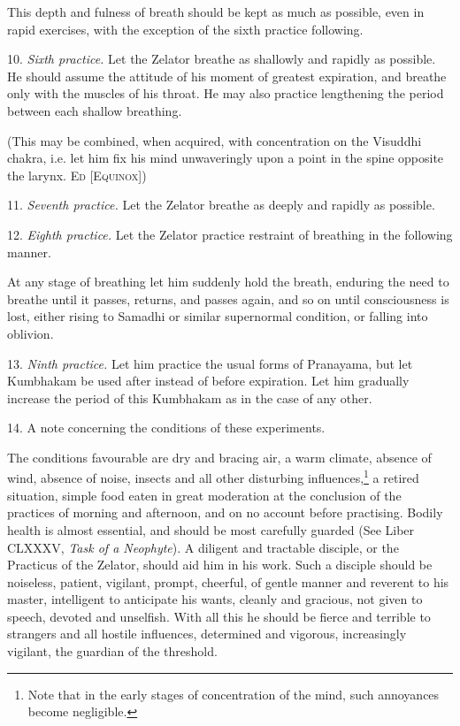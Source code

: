 This depth and fulness of breath should be kept as much as possible, even in rapid exercises, with the exception of the sixth practice following.

10. \textit{Sixth practice.} Let the Zelator breathe as shallowly and rapidly as possible. He should assume the attitude of his moment of greatest expiration, and breathe only with the muscles of his throat. He may also practice lengthening the period between each shallow breathing.

(This may be combined, when acquired, with concentration on the Visuddhi chakra, i.e. let him fix his mind unwaveringly upon a point in the spine opposite the larynx. \textsc{Ed [Equinox]})

11. \textit{Seventh practice.} Let the Zelator breathe as deeply and rapidly as possible.

12. \textit{Eighth practice.} Let the Zelator practice restraint of breathing in the following manner.

At any stage of breathing let him suddenly hold the breath, enduring the need to breathe until it passes, returns, and passes again, and so on until consciousness is lost, either rising to Samadhi or similar supernormal condition, or falling into oblivion.

13. \textit{Ninth practice.} Let him practice the usual forms of Pranayama, but let Kumbhakam be used after instead of before expiration. Let him gradually increase the period of this Kumbhakam as in the case of any other.

14. A note concerning the conditions of these experiments.

The conditions favourable are dry and bracing air, a warm climate, absence of wind, absence of noise, insects and all other disturbing influences,\footnote{Note that in the early stages of concentration of the mind, such annoyances become negligible.} a retired situation, simple food eaten in great moderation at the conclusion of the practices of morning and afternoon, and on no account before practising. Bodily health is almost essential, and should be most carefully guarded (See Liber CLXXXV, \textit{Task of a Neophyte}). A diligent and tractable disciple, or the Practicus of the Zelator, should aid him in his work. Such a disciple should be noiseless, patient, vigilant, prompt, cheerful, of gentle manner and reverent to his master, intelligent to anticipate his wants, cleanly and gracious, not given to speech, devoted and unselfish. With all this he should be fierce and terrible to strangers and all hostile influences, determined and vigorous, increasingly vigilant, the guardian of the threshold.

